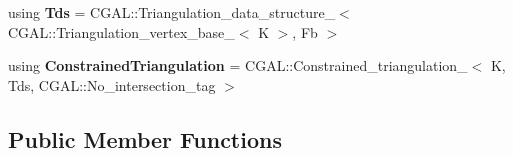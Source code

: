 \begin{DoxyCompactItemize}
\item 
\mbox{\label{classpepr3d_1_1_triangle_detail_a7ea6f709dd9bead683d75616fde6657f}} 
using {\bfseries Tds} = C\+G\+A\+L\+::\+Triangulation\+\_\+data\+\_\+structure\+\_$<$ C\+G\+A\+L\+::\+Triangulation\+\_\+vertex\+\_\+base\+\_$<$ K $>$, Fb $>$
\item 
\mbox{\label{classpepr3d_1_1_triangle_detail_a68c7fa9d0ed3fd567a38f771f69b48b6}} 
using {\bfseries Constrained\+Triangulation} = C\+G\+A\+L\+::\+Constrained\+\_\+triangulation\+\_$<$ K, Tds, C\+G\+A\+L\+::\+No\+\_\+intersection\+\_\+tag $>$
\end{DoxyCompactItemize}
\subsection*{Public Member Functions}
